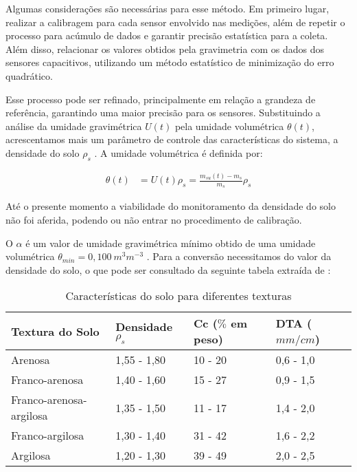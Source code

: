 		 Algumas considerações são necessárias para esse método. Em primeiro lugar, realizar a calibragem para cada sensor envolvido nas medições, além de repetir o processo para acúmulo de dados e garantir precisão estatística para a coleta. Além disso, relacionar os valores obtidos pela gravimetria com os dados dos sensores capacitivos, utilizando um método estatístico de minimização do erro quadrático.
		 
		 Esse processo pode ser refinado, principalmente em relação a grandeza de referência, garantindo uma maior precisão para os sensores. Substituindo a análise da umidade gravimétrica $U(t)$ pela umidade volumétrica $\theta(t)$, acrescentamos mais um parâmetro de controle das características do sistema, a densidade do solo $\rho_s$ \cite{bib_sen_01_ian}. A umidade volumétrica é definida por:

		 \begin{align*}
		 	\theta(t) &= U(t) \rho_s = \frac{m_{su}(t)-m_{s}}{m_{s}} \rho_s
		 \end{align*}
		
		Até o presente momento a viabilidade do monitoramento da densidade do solo não foi aferida, podendo ou não entrar no procedimento de calibração.
		
		O $\alpha$ é um valor de umidade gravimétrica mínimo obtido de uma umidade volumétrica $\theta_{min}=0,100~m^3 m^{-3}$ \cite{bib_sen_01_ian}. Para a conversão necessitamos do valor da densidade do solo, o que pode ser consultado da seguinte tabela extraída de \cite{bib_sen_04_ian}:
		
		\begin{table}[H]
			\caption{Características do solo para diferentes texturas}
			\label{CSDT}
			\begin{tabular}{|l|l|l|l|}
				\hline
				Textura do Solo & Densidade $\rho_s$ & Cc ($\%$ em peso) & DTA ($mm/cm$) \\ \hline
				Arenosa & 1,55 - 1,80 & 10 - 20 & 0,6 - 1,0 \\ \hline
				Franco-arenosa & 1,40 - 1,60 & 15 - 27 & 0,9 - 1,5 \\ \hline
				Franco-arenosa-argilosa & 1,35 - 1,50 & 11 - 17 & 1,4 - 2,0 \\ \hline
				Franco-argilosa & 1,30 - 1,40 & 31 - 42 & 1,6 - 2,2 \\ \hline
				Argilosa & 1,20 - 1,30 & 39 - 49 & 2,0 - 2,5 \\ \hline
			\end{tabular}
		\end{table} 	    
		
